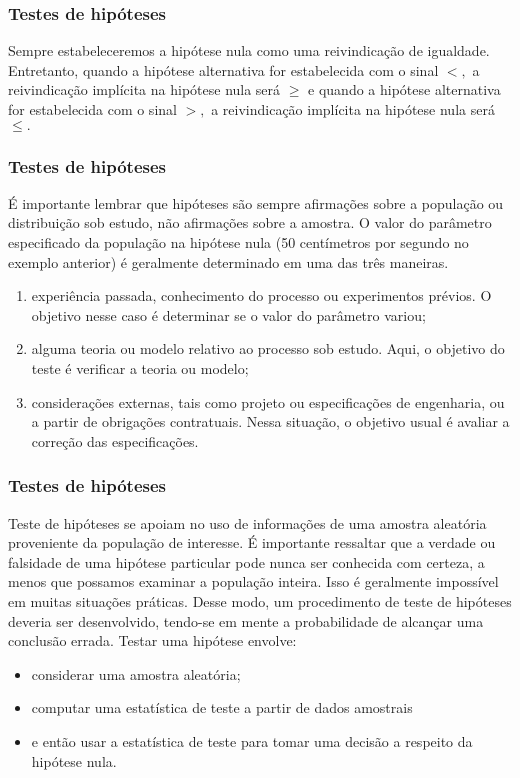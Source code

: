 \documentclass[14pt,aspectratio=1610]{beamer}
\begin{document}
\begin{frame}{}
\frametitle{Testes de hipóteses}

\begin{block}{}
\justifying
Sempre estabeleceremos a hipótese nula como uma reivindicação de igualdade. Entretanto, quando a hipótese alternativa for estabelecida com o sinal $<,$ a reivindicação 
implícita na hipótese nula será $\geq$ e quando a hipótese alternativa for estabelecida com o sinal $>,$ a reivindicação implícita na hipótese nula será $\leq.$
\end{block}
\end{frame}

\begin{frame}{}
\frametitle{Testes de hipóteses}
\begin{block}{}
\justifying
É importante lembrar que hipóteses são sempre afirmações sobre a população ou distribuição sob estudo, não afirmações sobre a amostra. O valor do parâmetro 
especificado da população na hipótese nula (50 centímetros por segundo no exemplo anterior) é geralmente determinado em uma das três maneiras. 
\begin{enumerate}
\item experiência passada, conhecimento do processo ou experimentos prévios. O objetivo nesse caso é determinar se o valor do parâmetro variou;\pause
\item alguma teoria ou modelo relativo ao processo sob estudo. Aqui, o objetivo do teste é verificar a teoria ou modelo;\pause
\item considerações externas, tais como projeto ou especificações de engenharia, ou a partir de obrigações contratuais. Nessa situação, o objetivo usual é avaliar a 
correção das especificações.
\end{enumerate}
 \end{block}
\end{frame}

\begin{frame}{}
\frametitle{Testes de hipóteses}
\begin{block}{}
\justifying
Teste de hipóteses se apoiam no uso de informações de uma amostra aleatória proveniente da população de interesse. É importante ressaltar que a verdade ou falsidade 
de uma hipótese particular pode nunca ser conhecida com certeza, a menos que possamos examinar a população inteira. Isso é geralmente impossível 
em muitas situações práticas. Desse modo, um procedimento de teste de hipóteses deveria ser desenvolvido, tendo-se em mente a probabilidade de alcançar uma 
conclusão errada. Testar uma hipótese envolve: 
\begin{itemize}
\item considerar uma amostra aleatória; \pause
\item computar uma estatística de teste a partir de dados amostrais \pause
\item e então usar a estatística de teste para tomar uma decisão a respeito da hipótese nula.
\end{itemize}
\end{block}
\end{frame}
\end{document}
